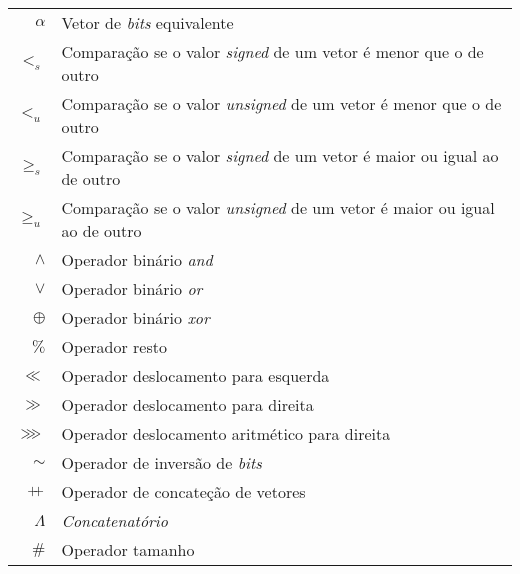     \begin{tabular}{rl}
      $\alpha$ & Vetor de \emph{bits} equivalente\\
      $<_s$ & Comparação se o valor \emph{signed} de um vetor é menor que o de outro\\
      $<_u$ & Comparação se o valor \emph{unsigned} de um vetor é menor que o de outro\\
      $\geq_s$ & Comparação se o valor \emph{signed} de um vetor é maior ou igual ao de outro\\
      $\geq_u$ & Comparação se o valor \emph{unsigned} de um vetor é maior ou igual ao de outro\\
      $\land$ & Operador binário \emph{and}\\
      $\lor$ & Operador binário \emph{or}\\
      $\oplus$ & Operador binário \emph{xor}\\
      $\%$ & Operador resto \\
      $\ll$ & Operador deslocamento para esquerda \\
      $\gg$ & Operador deslocamento para direita \\
      $\ggg$ & Operador deslocamento aritmético para direita \\
      $\sim$ & Operador de inversão de \emph{bits} \\
      $+\!\!+$ & Operador de concateção de vetores \\
      $\Lambda$ & \emph{Concatenatório} \\
      $\#$ & Operador tamanho \\
    \end{tabular}
    
    \clearpage
    
    
    \disablenewpage{\listoffigures}
    
    \disablenewpage{\listoftables}
    
    
